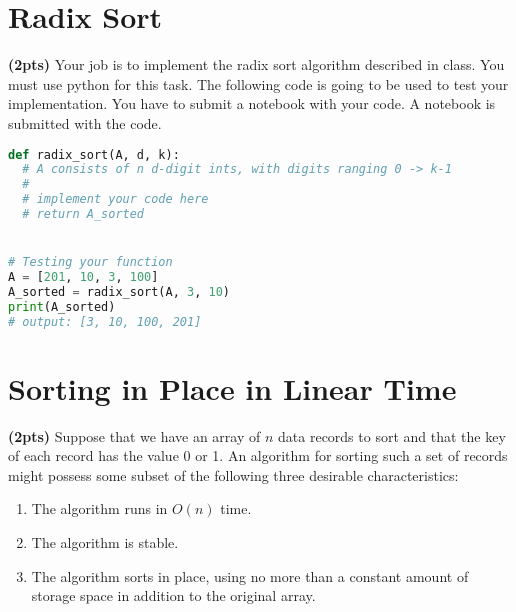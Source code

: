 \documentclass{article}
\begin{document}
\section{Radix Sort}

\textbf{(2pts) }Your job is to implement the radix sort algorithm described in class. You must use python for this task. The following code is going to be used to test your implementation. You have to submit a notebook with your code.
\bigbreak
A notebook is submitted with the code.
\bigbreak
  
\begin{lstlisting}[language=Python]
def radix_sort(A, d, k):
  # A consists of n d-digit ints, with digits ranging 0 -> k-1
  #
  # implement your code here
  # return A_sorted


# Testing your function
A = [201, 10, 3, 100]
A_sorted = radix_sort(A, 3, 10)
print(A_sorted)
# output: [3, 10, 100, 201]
\end{lstlisting}

\section{Sorting in Place in Linear Time}
\textbf{(2pts)} Suppose that we have an array of $n$ data records to sort and that the key of each record has the value 0 or 1. An algorithm for sorting such a set of records might possess some subset of the following three desirable characteristics:

\begin{enumerate}
  \item The algorithm runs in $O(n)$ time.
  \item The algorithm is stable.
  \item The algorithm sorts in place, using no more than a constant amount of storage space in addition to the original array.
\end{enumerate}
\end{document}

